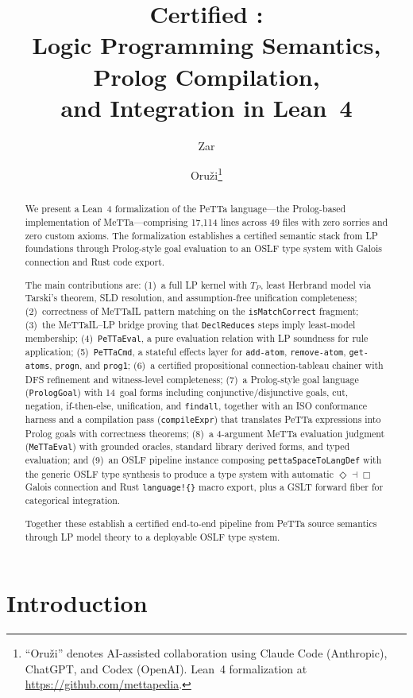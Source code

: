 \documentclass[]{article}
\title{Certified \PeTTa{}:\\Logic Programming Semantics, Prolog Compilation,\\and \OSLF{} Integration in Lean~4}
\author{Zar \and Oru\v{z}i\footnote{``Oru\v{z}i'' denotes AI-assisted collaboration using Claude Code (Anthropic), ChatGPT, and Codex (OpenAI).  Lean~4 formalization at \url{https://github.com/mettapedia}.}}
\newcommand{\code}[1]{\texttt{#1}}
\newcommand{\MeTTa}{\textup{MeTTa}}
\newcommand{\PeTTa}{\textup{PeTTa}}
\newcommand{\MeTTaIL}{\textup{MeTTaIL}}
\newcommand{\OSLF}{\textup{OSLF}}
\begin{document}
\maketitle

\begin{abstract}
We present a Lean~4 formalization of the \PeTTa{} language---the Prolog-based
implementation of \MeTTa{}---comprising 17{,}114 lines across 49 files with zero
sorries and zero custom axioms.  The formalization establishes a certified
semantic stack from LP foundations through Prolog-style goal evaluation to an
\OSLF{} type system with Galois connection and Rust code export.

The main contributions are: (1)~a full LP kernel with $T_P$, least Herbrand
model via Tarski's theorem, SLD resolution, and assumption-free unification
completeness; (2)~correctness of \MeTTaIL{} pattern matching on the
\code{isMatchCorrect} fragment; (3)~the \MeTTaIL{}--LP bridge proving that
\code{DeclReduces} steps imply least-model membership; (4)~\code{PeTTaEval},
a pure evaluation relation with LP soundness for rule application;
(5)~\code{PeTTaCmd}, a stateful effects layer for \code{add-atom},
\code{remove-atom}, \code{get-atoms}, \code{progn}, and \code{prog1};
(6)~a certified propositional connection-tableau chainer with DFS
refinement and witness-level completeness; (7)~a Prolog-style goal
language (\code{PrologGoal}) with 14~goal forms including conjunctive/disjunctive goals,
cut, negation, if-then-else, unification, and \code{findall},
together with an ISO conformance harness and a compilation pass
(\code{compileExpr}) that translates \PeTTa{} expressions into Prolog goals with
correctness theorems; (8)~a 4-argument \MeTTa{} evaluation judgment
(\code{MeTTaEval}) with grounded oracles, standard library derived forms, and
typed evaluation; and (9)~an \OSLF{} pipeline instance composing
\code{pettaSpaceToLangDef} with the generic \OSLF{} type synthesis to produce
a type system with automatic $\Diamond \dashv \Box$ Galois connection and Rust
\code{language!\{\}} macro export, plus a GSLT forward fiber for categorical
integration.

Together these establish a certified end-to-end pipeline from \PeTTa{} source
semantics through LP model theory to a deployable \OSLF{} type system.
\end{abstract}

\tableofcontents

\section{Introduction}
\end{document}
